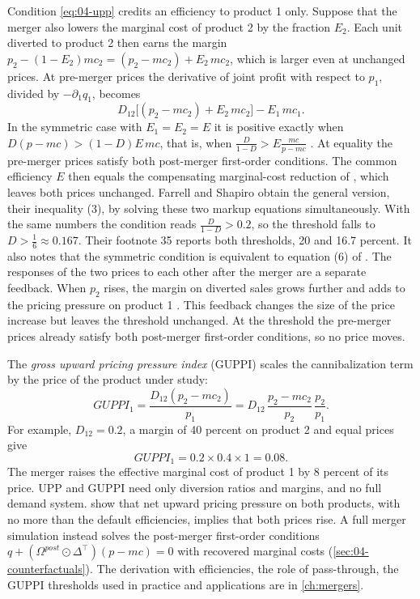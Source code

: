 Condition \eqref{eq:04-upp} credits an efficiency to product 1 only. Suppose that the merger also lowers the
marginal cost of product 2 by the fraction $E_2$. Each unit diverted to product 2 then earns the margin
$p_2 - (1 - E_2)mc_2 = (p_2 - mc_2) + E_2\,mc_2$, which is larger even at unchanged prices. At pre-merger prices
the derivative of joint profit with respect to $p_1$, divided by $-\partial_1 q_1$, becomes
\[
  D_{12}\big[(p_2 - mc_2) + E_2\,mc_2\big] - E_1\,mc_1.
\]
In the symmetric case with $E_1 = E_2 = E$ it is positive exactly when $D(p - mc) > (1 - D)E\,mc$, that is, when
$\frac{D}{1 - D} > E\frac{mc}{p - mc}$ \citep[p.~14, inequality (4)]{FarrellShapiro2010}. At equality the
pre-merger prices satisfy both post-merger first-order conditions. The common efficiency $E$ then equals the
compensating marginal-cost reduction of \citet{Werden1996}, which leaves both prices unchanged. Farrell and
Shapiro obtain the general version, their inequality (3), by solving these two markup equations simultaneously.
With the same numbers the condition reads $\frac{D}{1 - D} > 0.2$, so the threshold falls to
$D > \frac{1}{6} \approx 0.167$. Their footnote 35 reports both thresholds, 20 and 16.7 percent. It also notes
that the symmetric condition is equivalent to equation (6) of \citet{Werden1996}. The responses of the two prices
to each other after the merger are a separate feedback. When $p_2$ rises, the margin on diverted sales grows
further and adds to the pricing pressure on product 1 \citep[p.~13]{FarrellShapiro2010}. This feedback changes
the size of the price increase but leaves the threshold unchanged. At the threshold the pre-merger prices already
satisfy both post-merger first-order conditions, so no price moves.

The \emph{gross upward pricing pressure index} (GUPPI) scales the cannibalization term by the price of the product
under study:
\begin{equation}\label{eq:04-guppi}
  \mathit{GUPPI}_1 = \frac{D_{12}(p_2 - mc_2)}{p_1} = D_{12}\,\frac{p_2 - mc_2}{p_2}\,\frac{p_2}{p_1}.
\end{equation}
For example, $D_{12} = 0.2$, a margin of 40 percent on product 2 and equal prices give
\[
  \mathit{GUPPI}_1 = 0.2 \times 0.4 \times 1 = 0.08.
\]
The merger raises the effective marginal cost of product 1 by 8 percent of its price. UPP and GUPPI need
only diversion ratios and margins, and no full demand system. \citet[p.~12, Proposition 1]{FarrellShapiro2010}
show that net upward pricing pressure on both products, with no more than the default efficiencies, implies
that both prices rise. A full merger simulation instead solves the post-merger first-order conditions
$q + (\Omega^{post}\odot\Delta^\top)(p - mc) = 0$ with recovered marginal costs (\cref{sec:04-counterfactuals}).
The derivation with efficiencies, the role of pass-through, the GUPPI thresholds used in practice and
applications are in \cref{ch:mergers}.

